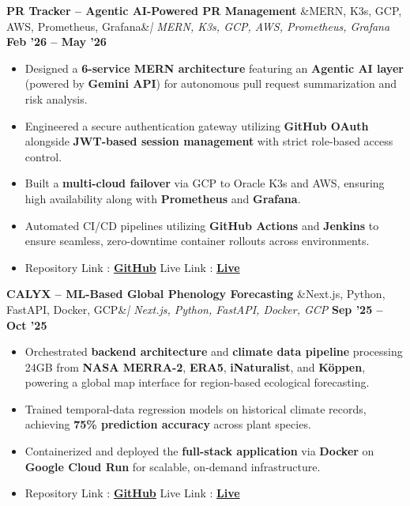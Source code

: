 \documentclass[letterpaper, 11pt]{article}
\newcommand{\cventry}[3]{%
  \noindent
  \textbf{#1}%
  \ifx&#2&\else\enspace\textit{| #2}\fi%
  \hfill\textbf{#3}\par
  \vspace{1pt}%
}
\begin{document}
\vspace{3pt}
\cventry{PR Tracker -- Agentic AI-Powered PR Management}{MERN, K3s, GCP, AWS, Prometheus, Grafana}{Feb '26 -- May '26}
\begin{itemize}
  \item Designed a \textbf{6-service MERN architecture} featuring an \textbf{Agentic AI layer} (powered by \textbf{Gemini API}) for autonomous pull request summarization and risk analysis.
  \item Engineered a secure authentication gateway utilizing \textbf{GitHub OAuth} alongside \textbf{JWT-based session management} with strict role-based access control.
  \item Built a \textbf{multi-cloud failover} via GCP to Oracle K3s and AWS, ensuring high availability along with \textbf{Prometheus} and \textbf{Grafana}.
  \item Automated CI/CD pipelines utilizing \textbf{GitHub Actions} and \textbf{Jenkins} to ensure seamless, zero-downtime container rollouts across environments.
  \item [] Repository Link : \href{https://github.com/Dhruv1249/Pr-Tracker}{\textbf{GitHub}} \quad
        Live Link : \href{https://pr-tracker.dev}{\textbf{Live}}
\end{itemize}

\vspace{3pt}
\cventry{CALYX -- ML-Based Global Phenology Forecasting}{Next.js, Python, FastAPI, Docker, GCP}{Sep '25 -- Oct '25}
\begin{itemize}
 \item Orchestrated \textbf{backend architecture} and \textbf{climate data pipeline} processing 24GB from \textbf{NASA MERRA-2}, \textbf{ERA5}, \textbf{iNaturalist}, and \textbf{K{\"o}ppen}, powering a global map interface for region-based ecological forecasting.
  \item Trained temporal-data regression models on historical climate records, achieving \textbf{75\% prediction accuracy} across plant species.
\item Containerized and deployed the \textbf{full-stack application} via \textbf{Docker} on \textbf{Google Cloud Run} for scalable, on-demand infrastructure.
  \item [] Repository Link : \href{https://github.com/Dhruv1249/Plant-Phenology-State-Detector}{\textbf{GitHub}} \quad
        Live Link : \href{https://plant-phenology-state-detector.vercel.app/}{\textbf{Live}}
\end{itemize}
\end{document}
